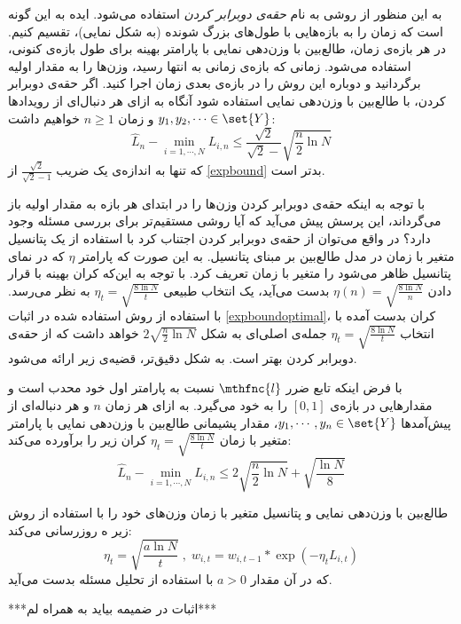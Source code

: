 
به این منظور از روشی به نام 
\textit{
حقه‌ی دوبرابر کردن
} 
استفاده می‌شود. ایده به این گونه است که زمان را به بازه‌هایی با طول‌های بزرگ شونده (به شکل نمایی)، تقسیم کنیم. در هر بازه‌ی زمان، طالع‌بین با وزن‌دهی نمایی با پارامتر بهینه برای طول بازه‌ی کنونی، استفاده می‌شود. زمانی که بازه‌ی زمانی به انتها رسید، وزن‌ها را به مقدار اولیه برگردانید و دوباره این روش را در بازه‌ی بعدی زمان اجرا کنید. اگر حقه‌ی دوبرابر کردن، با طالع‌بین با وزن‌دهی نمایی استفاده شود آنگاه به ازای هر دنبال‌ای از رویدادها 
$y_1, y_2, \cdots \in \set{Y}$ 
و زمان 
$n \geq 1$ 
خواهیم داشت:
\[
\hat{L}_n - \min_{i=1,\cdots,N} L_{i,n} \leq \frac{\sqrt{2}}{\sqrt{2} - } \sqrt{\frac{n}{2} \ln N}
\]
که تنها به اندازه‌ی یک ضریب 
$\frac{\sqrt{2}}{\sqrt{2} - 1}$ 
از 
\ref{expbound} 
بدتر است.


با توجه به اینکه حقه‌ی دوبرابر کردن وزن‌ها را در ابتدای هر بازه به مقدار اولیه باز می‌گرداند، این پرسش پیش می‌آید که آیا روشی مستقیم‌تر برای بررسی مسئله وجود دارد؟ در واقع می‌توان از حقه‌ی دوبرابر کردن اجتناب کرد با استفاده از یک پتانسیل متغیر با زمان در مدل طالع‌بین بر مبنای پتانسیل. به این صورت که پارامتر 
$\eta$ 
که در نمای پتانسیل ظاهر می‌شود را متغیر با زمان تعریف کرد. با توجه به این‌که کران بهینه با قرار دادن 
$\eta(n) = \sqrt{\frac{8 \ln N}{n}}$ 
بدست می‌آید، یک انتخاب طبیعی 
$\eta_t = \sqrt{\frac{8 \ln N}{t}}$ 
به نظر می‌رسد. با استفاده از روش استفاده شده در اثبات 
\ref{expboundoptimal}، 
کران بدست آمده با انتخاب 
$\eta_t = \sqrt{\frac{8 \ln N}{t}}$ 
جمله‌ی اصلی‌ای به شکل 
$2 \sqrt{\frac{n}{2} \ln N}$ 
خواهد داشت که از حقه‌ی دوبرابر کردن بهتر است. به شکل دقیق‌تر، قضیه‌ی زیر ارائه می‌شود.

\begin{theorem}
\label{expbounduniform}

با فرض اینکه تابع ضرر 
$\mthfnc{l}$ 
نسبت به پارامتر اول خود محدب است و مقدارهایی در بازه‌ی 
$[0,1]$ 
را به خود می‌گیرد. به ازای هر زمان 
$n$ 
و هر دنباله‌ای از پیش‌آمدها 
$y_1, \cdots, y_n \in \set{Y}$، 
مقدار پشیمانی طالع‌بین با وزن‌دهی نمایی با پارامتر متغیر با زمان 
$\eta_t = \sqrt{\frac{ 8 \ln N }{t} }$  
کران زیر را برآورده می‌کند:
\[
\hat{L}_n - \min_{i=1,\cdots,N} L_{i,n} \leq 2 \sqrt{\frac{n}{2} \ln N} + \sqrt{ \frac{\ln N}{8} }
\]

\end{theorem}

طالع‌بین با وزن‌دهی نمایی و پتانسیل متغیر با زمان وزن‌های خود را با استفاده از روش زیر ه روزرسانی می‌کند:
\[
\eta_t = \sqrt{\frac{ a \ln N }{t} } \; , \; w_{i,t} = w_{i,t-1} * \exp( - \eta_t L_{i,t} )
\]
که در آن مقدار 
$a > 0$ 
با استفاده از تحلیل مسئله بدست می‌آید.

***اثبات در ضمیمه بیاید به همراه لم***